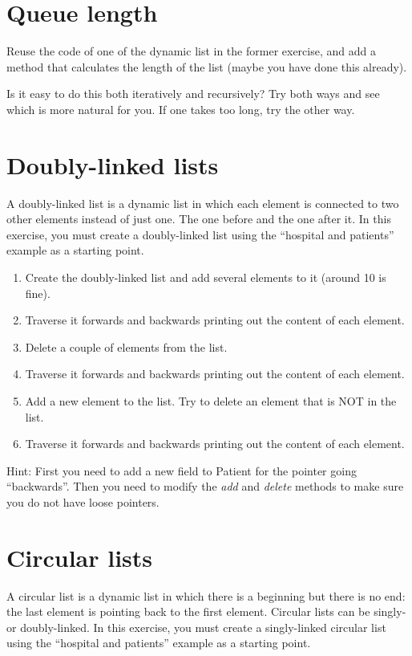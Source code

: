 \documentclass{article}
\begin{document}
\section{Queue length}
\label{sec:queue-length}

Reuse the code of one of the dynamic list in the former exercise, and
add a method that calculates the length of the list (maybe you have
done this already). 

Is it easy to do this both iteratively and recursively? Try both ways
and see which is more natural for you. If one takes too long, try the
other way. 

\section{Doubly-linked lists}
\label{sec:doublyr-linked-lists}

A doubly-linked list is a dynamic list in which each element is
connected to two other elements instead of just one. The one before
and the one after it. In this exercise, you must create a
doubly-linked list using the ``hospital and patients'' example as a
starting point.

\begin{enumerate}
\item Create the doubly-linked list and add several elements to it
  (around 10 is fine). 
\item Traverse it forwards and backwards printing out the content of
  each element.
\item Delete a couple of elements from the list. 
\item Traverse it forwards and backwards printing out the content of
  each element.
\item Add a new element to the list. Try to delete an element that is
  NOT in the list. 
\item Traverse it forwards and backwards printing out the content of
  each element.
\end{enumerate}

Hint: First you need to add a new field to Patient for the pointer
going ``backwards''. Then you need to modify the \emph{add} and
\emph{delete} methods to make sure you do not have loose pointers. 

\section{Circular lists}
\label{sec:circular-lists}

A circular list is a dynamic list in which there is a beginning but
there is no end: the last element is pointing back to the first
element. Circular lists can be singly- or doubly-linked. In this
exercise, you must create a singly-linked circular list using the
``hospital and patients'' example as a starting point.
\end{document}
